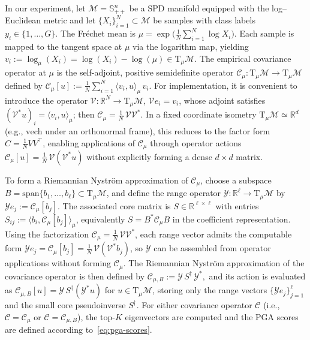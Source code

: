 \documentclass[final,onefignum,onetabnum]{siamart250211}
\begin{document}
In our experiment, let $\mathcal{M}=\mathbb{S}_{++}^n$ be a SPD manifold equipped with the log--Euclidean metric and let $\{X_i\}_{i=1}^N\subset\mathcal{M}$ be samples with class labels $y_i\in\{1,\dots,G\}$. The Fr\'echet mean is $\mu=\exp\!\big(\tfrac1N\sum_{i=1}^N \log X_i\big)$. Each sample is mapped to the tangent space at $\mu$ via the logarithm map, yielding $v_i:=\log_\mu(X_i)=\log(X_i)-\log(\mu)\in \mathrm{T}_\mu\mathcal{M}$. 
The empirical covariance operator at $\mu$ is the self-adjoint, positive semidefinite operator $\mathcal{C}_\mu:\mathrm{T}_\mu\mathcal{M}\to \mathrm{T}_\mu\mathcal{M}$ defined by $\mathcal{C}_\mu[u]:=\tfrac1N\sum_{i=1}^N\langle v_i,u\rangle_\mu\,v_i$. For implementation, it is convenient to introduce the operator $\mathcal{V}:\mathbb{R}^N\to \mathrm{T}_\mu\mathcal{M}$, $\mathcal{V}e_i=v_i$, whose adjoint satisfies $(\mathcal{V}^\ast u)_i=\langle v_i,u\rangle_\mu$; then $\mathcal{C}_\mu=\tfrac1N\,\mathcal{V}\mathcal{V}^\ast$. 
In a fixed coordinate isometry $\mathrm{T}_\mu\mathcal{M}\simeq\mathbb{R}^d$ (e.g., $\mathrm{vech}$ under an orthonormal frame), this reduces to the factor form $C=\tfrac1N VV^\top$, enabling applications of $\mathcal{C}_\mu$ through operator actions $\mathcal{C}_\mu[u]=\tfrac1N\,\mathcal{V}(\mathcal{V}^\ast u)$ without explicitly forming a dense $d\times d$ matrix.

To form a Riemannian Nystr\"om approximation of $\mathcal{C}_\mu$, choose a subspace $B=\mathrm{span}\{b_1,\dots,b_\ell\}\subset \mathrm{T}_\mu\mathcal{M}$, and define the range operator $\mathcal{Y}:\mathbb{R}^\ell\to \mathrm{T}_\mu\mathcal{M}$ by $\mathcal{Y}e_j:=\mathcal{C}_\mu[b_j]$. The associated core matrix is $S\in\mathbb{R}^{\ell\times \ell}$ with entries $S_{ij}:=\langle b_i,\mathcal{C}_\mu[b_j]\rangle_\mu$, equivalently $S=B^\ast\mathcal{C}_\mu B$ in the coefficient representation. Using the factorization $\mathcal{C}_\mu=\tfrac1N\,\mathcal{V}\mathcal{V}^\ast$, each range vector admits the computable form $\mathcal{Y}e_j=\mathcal{C}_\mu[b_j]=\tfrac1N\,\mathcal{V}(\mathcal{V}^\ast b_j)$, so $\mathcal{Y}$ can be assembled from operator applications without forming $\mathcal{C}_\mu$. The Riemannian Nystr\"om approximation of the covariance operator is then defined by
$
\mathcal{C}_{\mu,B}:=\mathcal{Y}\,S^\dagger\,\mathcal{Y}^\ast,
$
and its action is evaluated as $\mathcal{C}_{\mu,B}[u]=\mathcal{Y}\,S^\dagger(\mathcal{Y}^\ast u)$ for $u\in \mathrm{T}_\mu\mathcal{M}$, storing only the range vectors $\{\mathcal{Y}e_j\}_{j=1}^\ell$ and the small core pseudoinverse $S^\dagger$. For either covariance operator $\mathcal{C}$ (i.e., $\mathcal{C}=\mathcal{C}_\mu$ or $\mathcal{C}=\mathcal{C}_{\mu,B}$), the top-$K$ eigenvectors are computed and the PGA scores are defined according to~\eqref{eq:pga-scores}.
\end{document}
